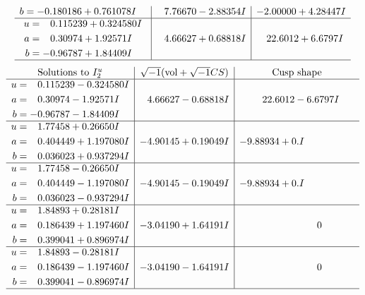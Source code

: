 \documentclass[1p]{elsarticle_modified}
\theoremstyle{definition}
\newcommand{\I}{\sqrt{-1}}
\begin{document}
$$\begin{array}{c|c|c}
\begin{aligned}
b &= -0.180186 + 0.761078 I\end{aligned}
 & \phantom{-}7.76670 - 2.88354 I & -2.00000 + 4.28447 I \\ \hline\begin{aligned}
u &= \phantom{-}0.115239 + 0.324580 I \\
a &= \phantom{-}0.30974 + 1.92571 I \\
b &= -0.96787 + 1.84409 I\end{aligned}
 & \phantom{-}4.66627 + 0.68818 I & \phantom{-}22.6012 + 6.6797 I\\
 \hline 
 \end{array}$$\newpage$$\begin{array}{c|c|c}  
\text{Solutions to }I^u_{2}& \I (\text{vol} + \sqrt{-1}CS) & \text{Cusp shape}\\
 \hline 
\begin{aligned}
u &= \phantom{-}0.115239 - 0.324580 I \\
a &= \phantom{-}0.30974 - 1.92571 I \\
b &= -0.96787 - 1.84409 I\end{aligned}
 & \phantom{-}4.66627 - 0.68818 I & \phantom{-}22.6012 - 6.6797 I \\ \hline\begin{aligned}
u &= \phantom{-}1.77458 + 0.26650 I \\
a &= \phantom{-}0.404449 + 1.197080 I \\
b &= \phantom{-}0.036023 + 0.937294 I\end{aligned}
 & -4.90145 + 0.19049 I & -9.88934 + 0. I\phantom{ +0.000000I} \\ \hline\begin{aligned}
u &= \phantom{-}1.77458 - 0.26650 I \\
a &= \phantom{-}0.404449 - 1.197080 I \\
b &= \phantom{-}0.036023 - 0.937294 I\end{aligned}
 & -4.90145 - 0.19049 I & -9.88934 + 0. I\phantom{ +0.000000I} \\ \hline\begin{aligned}
u &= \phantom{-}1.84893 + 0.28181 I \\
a &= \phantom{-}0.186439 + 1.197460 I \\
b &= \phantom{-}0.399041 + 0.896974 I\end{aligned}
 & -3.04190 + 1.64191 I & \phantom{-0.000000 } 0 \\ \hline\begin{aligned}
u &= \phantom{-}1.84893 - 0.28181 I \\
a &= \phantom{-}0.186439 - 1.197460 I \\
b &= \phantom{-}0.399041 - 0.896974 I\end{aligned}
 & -3.04190 - 1.64191 I & \phantom{-0.000000 } 0\\
 \hline 
 \end{array}$$\newpage\newpage\renewcommand{\arraystretch}{1}
\end{document}
